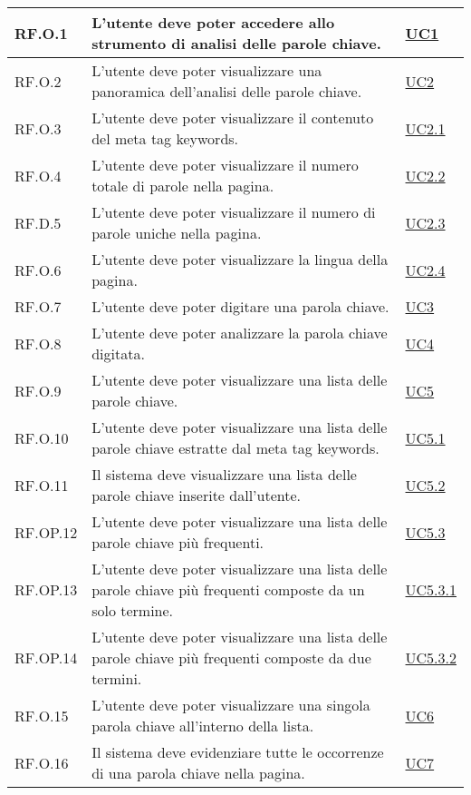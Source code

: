\begin{tabularx}{\textwidth}{l >{\raggedright\arraybackslash}X l}
\hline
RF.O.1 & L'utente deve poter accedere allo strumento di analisi delle parole chiave. & \hyperref[UC1]{UC1} \\
\hline
RF.O.2 & L'utente deve poter visualizzare una panoramica dell'analisi delle parole chiave. & \hyperref[UC2]{UC2} \\
\hline
RF.O.3 & L'utente deve poter visualizzare il contenuto del meta tag keywords. & \hyperref[UC2point1]{UC2.1} \\
\hline
RF.O.4 & L'utente deve poter visualizzare il numero totale di parole nella pagina. & \hyperref[UC2point2]{UC2.2} \\
\hline
RF.D.5 & L'utente deve poter visualizzare il numero di parole uniche nella pagina. & \hyperref[UC2point3]{UC2.3} \\
\hline
RF.O.6 & L'utente deve poter visualizzare la lingua della pagina. & \hyperref[UC2point4]{UC2.4} \\
\hline
RF.O.7 & L'utente deve poter digitare una parola chiave. & \hyperref[UC3]{UC3} \\
\hline
RF.O.8 & L'utente deve poter analizzare la parola chiave digitata. & \hyperref[UC4]{UC4} \\
\hline
RF.O.9 & L'utente deve poter visualizzare una lista delle parole chiave. & \hyperref[UC5]{UC5} \\
\hline
RF.O.10 & L'utente deve poter visualizzare una lista delle parole chiave estratte dal meta tag keywords. & \hyperref[UC5point1]{UC5.1} \\
\hline
RF.O.11 & Il sistema deve visualizzare una lista delle parole chiave inserite dall'utente. & \hyperref[UC5point2]{UC5.2} \\
\hline
RF.OP.12 & L'utente deve poter visualizzare una lista delle parole chiave più frequenti. & \hyperref[UC5point3]{UC5.3} \\
\hline
RF.OP.13 & L'utente deve poter visualizzare una lista delle parole chiave più frequenti composte da un solo termine. & \hyperref[UC5point3point1]{UC5.3.1} \\
\hline
RF.OP.14 & L'utente deve poter visualizzare una lista delle parole chiave più frequenti composte da due termini. & \hyperref[UC5point3point2]{UC5.3.2} \\
\hline
RF.O.15 & L'utente deve poter visualizzare una singola parola chiave all'interno della lista. & \hyperref[UC6]{UC6} \\
\hline
RF.O.16 & Il sistema deve evidenziare tutte le occorrenze di una parola chiave nella pagina. & \hyperref[UC7]{UC7} \\

\end{tabularx}
